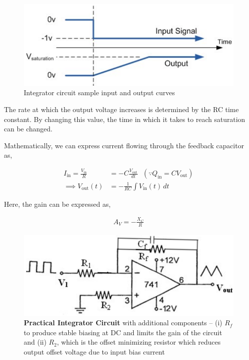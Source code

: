 \begin{figure}[H]
    \centering
    \includegraphics[width=0.9\columnwidth]{images/integrator_plot.png}
    \caption{Integrator circuit sample input and output curves}
    \label{int2}
\end{figure}

The rate at which the output voltage increases is determined by the RC time constant. By changing this value, the time in which it takes  to reach saturation can be changed.

Mathematically, we can express current flowing through the feedback capacitor as,

\begin{align}
    I_\text{in} = \frac{V_\text{in}}{R} &= -C\frac{V_\text{out}}{dt}\,\,\,\,(\because Q_\text{in}=CV_\text{out}) \nonumber\\
    \implies V_\text{out}(t) &= -\frac{1}{RC}\int V_\text{in}(t) \,dt 
\end{align}

Here, the gain can be expressed as,

\begin{align}
    A_V = -\frac{X_C}{R} \label{integrator_gain}
\end{align}

\begin{figure}[H]
    \centering
    \includegraphics[width=0.9\columnwidth]{images/intcircuit.png}
    \caption{\textbf{Practical Integrator Circuit} with additional components -- (i) $R_f$ to produce stable biasing at DC and limits the gain of the circuit and (ii) $R_2$, which is the offset minimizing resistor which reduces output offset voltage due to input bias current}
    \label{intexp}
\end{figure}

